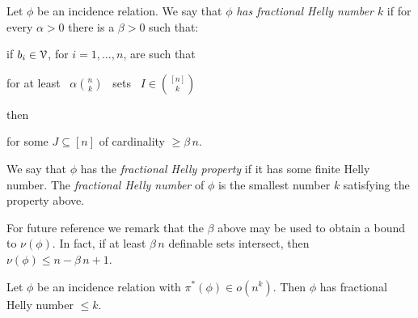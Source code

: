 \documentclass[scombinatorics.tex]{subfiles}
\begin{document}
\begin{definition}
Let $\phi$ be an incidence relation.
We say that $\phi$ \emph{has fractional Helly number $k$\/} if for every $\alpha>0$ there is a $\beta>0$ such that:

if $b_i\in\EuScript V$, for $i=1,\dots,n$, are such that

\hfill for at least \ $\displaystyle\alpha{n\choose k}$ \ sets \ $\displaystyle I\in{[n]\choose k}$

then

\hfill for some $J\subseteq [n]$ of cardinality $\ge\beta\,n$.

We say that $\phi$ has the \emph{fractional Helly property\/} if it has some finite Helly number.
The \emph{fractional Helly number\/} of $\phi$ is the smallest number $k$ satisfying the property above.
\QED
\end{definition}

For future reference we remark that the $\beta$ above may be used to obtain a bound to $\nu(\phi)$. In fact, if at least $\beta\,n$ definable sets intersect, then $\nu(\phi)\le n-\beta\,n+1$.  

\begin{theorem}
Let $\phi$ be an incidence relation with $\pi^*(\phi)\in o(n^k)$.
Then $\phi$ has fractional Helly number $\le k$.
\end{theorem}
\end{document}
